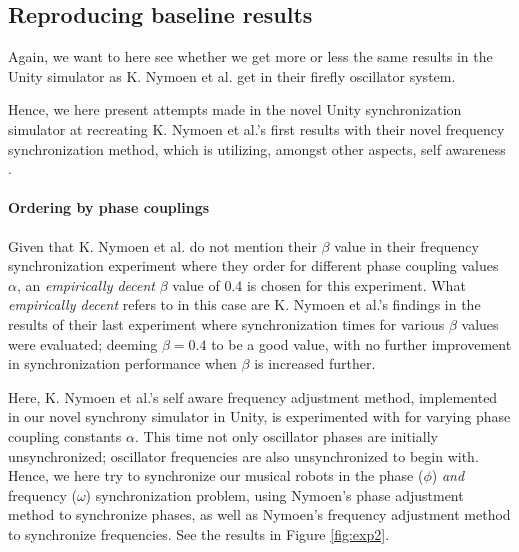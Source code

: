 	\subsection{Reproducing baseline results}
	Again, we want to here see whether we get more or less the same results in the Unity simulator as K. Nymoen et al. get in their firefly oscillator system.
	
	Hence, we here present attempts made in the novel Unity synchronization simulator at recreating K. Nymoen et al.'s first results with their novel frequency synchronization method, which is utilizing, amongst other aspects, self awareness \cite{nymoen_synch}.
	
		\paragraph{Ordering by phase couplings}
		
		Given that K. Nymoen et al. do not mention their $\beta$ value in their frequency synchronization experiment where they order for different phase coupling values $\alpha$, an \textit{empirically decent} $\beta$ value of 0.4 is chosen for this experiment. What \textit{empirically decent} refers to in this case are K. Nymoen et al.'s findings in the results of their last experiment \cite{nymoen_synch} where synchronization times for various $\beta$ values were evaluated; deeming $\beta=0.4$ to be a good value, with no further improvement in synchronization performance when $\beta$ is increased further.
		
		Here, K. Nymoen et al.'s self aware frequency adjustment method, implemented in our novel synchrony simulator in Unity, is experimented with for varying phase coupling constants $\alpha$. This time not only oscillator phases are initially unsynchronized; oscillator frequencies are also unsynchronized to begin with. Hence, we here try to synchronize our musical robots in the phase ($\phi$) \textit{and} frequency ($\omega$) synchronization problem, using Nymoen's phase adjustment method to synchronize phases, as well as Nymoen's frequency adjustment method to synchronize frequencies. See the results in Figure \ref{fig:exp2}.
		
